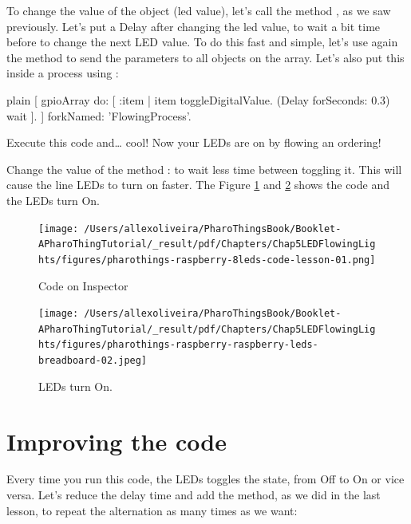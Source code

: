 \documentclass[10pt,twoside,english]{_support/latex/sbabook/sbabook}
\begin{document}
To change the value of the object (led value), let’s call the method , as we saw previously. Let’s put a Delay after changing the led value, to wait a bit time before to change the next LED value. To do this fast and simple, let’s use again the method  to send the parameters to all objects on the array. Let’s also put this inside a process using :

\begin{displaycode}{plain}
[
    gpioArray do: [ :item | item toggleDigitalValue. (Delay forSeconds: 0.3) wait ].
] forkNamed: 'FlowingProcess'.
\end{displaycode}

Execute this code and… cool! Now your LEDs are on by flowing an ordering!

Change the value of the method : to wait less time between toggling it. This will cause the line LEDs to turn on faster. The Figure \ref{Inspector8LEDs} and \ref{8LEDs} shows the code and the LEDs turn On.


\begin{figure}

\begin{center}
\texttt{[image: /Users/allexoliveira/PharoThingsBook/Booklet-APharoThingTutorial/\_result/pdf/Chapters/Chap5LEDFlowingLights/figures/pharothings-raspberry-8leds-code-lesson-01.png]}\caption{Code on Inspector\label{Inspector8LEDs}}\end{center}
\end{figure}


\begin{figure}

\begin{center}
\texttt{[image: /Users/allexoliveira/PharoThingsBook/Booklet-APharoThingTutorial/\_result/pdf/Chapters/Chap5LEDFlowingLights/figures/pharothings-raspberry-raspberry-leds-breadboard-02.jpeg]}\caption{LEDs turn On.\label{8LEDs}}\end{center}
\end{figure}

\section{Improving the code}
Every time you run this code, the LEDs toggles the state, from Off to On or vice versa. Let’s reduce the delay time and add the  method, as we did in the last lesson, to repeat the alternation as many times as we want:
\end{document}
